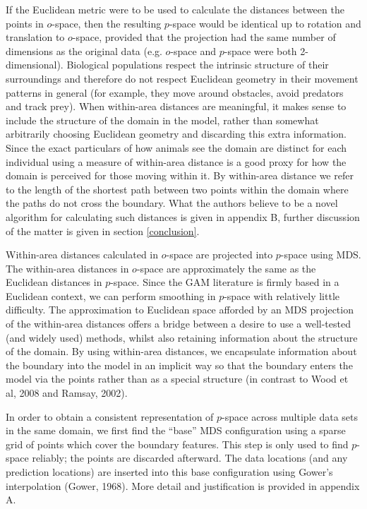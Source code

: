 \documentclass[useAMS, referee]{biom}
\begin{document}
If the Euclidean metric were to be used to calculate the distances between the points in $o$-space, then the resulting $p$-space would be identical up to rotation and translation to $o$-space, provided that the projection had the same number of dimensions as the original data (e.g. $o$-space and $p$-space were both 2-dimensional). Biological populations respect the intrinsic structure of their surroundings and therefore do not respect Euclidean geometry in their movement patterns in general (for example, they move around obstacles, avoid predators and track prey). When within-area distances are meaningful, it makes sense to include the structure of the domain in the model, rather than somewhat arbitrarily choosing Euclidean geometry and discarding this extra information. Since the exact particulars of how animals see the domain are distinct for each individual using a measure of within-area distance is a good proxy for how the domain is perceived for those moving within it. By within-area distance we refer to the length of the shortest path between two points within the domain where the paths do not cross the boundary. What the authors believe to be a novel algorithm for calculating such distances is given in appendix B, further discussion of the matter is given in section \ref{conclusion}.

Within-area distances calculated in $o$-space are projected into $p$-space using MDS. The within-area distances in $o$-space are approximately the same as the Euclidean distances in $p$-space. Since the GAM literature is firmly based in a Euclidean context, we can perform smoothing in $p$-space with relatively little difficulty. The approximation to Euclidean space afforded by an MDS projection of the within-area distances offers a bridge between a desire to use a well-tested (and widely used) methods, whilst also retaining information about the structure of the domain. By using within-area distances, we encapsulate information about the boundary into the model in an implicit way so that the boundary enters the model via the points rather than as a special structure (in contrast to Wood et al, 2008 and Ramsay, 2002).

In order to obtain a consistent representation of $p$-space across multiple data sets in the same domain, we first find the ``base'' MDS configuration using a sparse grid of points which cover the boundary features. This step is only used to find $p$-space reliably; the points are discarded afterward. The data locations (and any prediction locations) are inserted into this base configuration using Gower's interpolation (Gower, 1968). More detail and justification is provided in appendix A.
\end{document}
